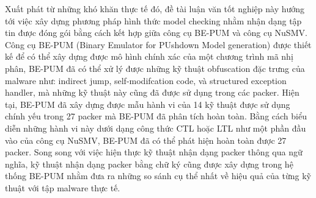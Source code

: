 \hspace{0.5cm}Xuất phát từ những khó khăn thực tế đó, đề tài luận văn tốt nghiệp này hướng tới việc xây dựng phương pháp hình thức model checking nhằm nhận dạng tập tin được đóng gói bằng cách kết hợp giữa công cụ BE-PUM và công cụ NuSMV. Công cụ BE-PUM (Binary Emulator for PUshdown Model generation) được thiết kế để có thể xây dựng được mô hình chính xác của một chương trình mã nhị phân, BE-PUM đã có thể xử lý được những kỹ thuật obfuscation đặc trưng của malware như: indirect jump, self-modifcation code, và structured exception handler, mà những kỹ thuật này cũng đã được sử dụng trong các packer. Hiện tại, BE-PUM đã xây dựng được mẫu hành vi của 14 kỹ thuật được sử dụng chính yếu trong 27 packer mà BE-PUM đã phân tích hoàn toàn. Bằng cách biểu diễn những hành vi này dưới dạng công thức CTL hoặc LTL như một phần đầu vào của công cụ NuSMV, BE-PUM đã có thể phát hiện hoàn toàn được 27 packer. Song song với việc hiện thực kỹ thuật nhận dạng packer thông qua ngữ nghĩa, kỹ thuật nhận dạng packer bằng chữ ký cũng được xây dựng trong hệ thống BE-PUM nhằm đưa ra những so sánh cụ thể nhất về hiệu quả của từng kỹ thuật với tập malware thực tế.\\

